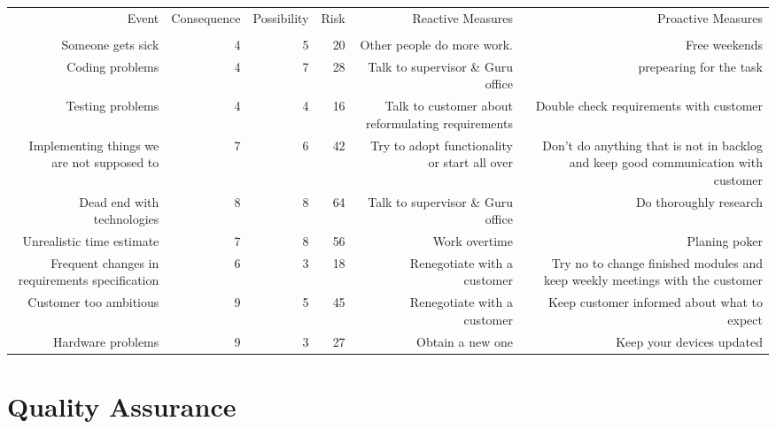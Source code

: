 \documentclass{article}
\begin{document}
\begin{tabular}{rrrrrr}
Event & Consequence & Possibility & Risk  & Reactive Measures & Proactive Measures \\
      &       &       &       &       &  \\
Someone gets sick & 4     & 5     & 20    & Other people do more work.  & Free weekends \\
Coding problems & 4     & 7     & 28    & Talk to supervisor \& Guru office & prepearing for the task \\
Testing problems & 4     & 4     & 16    & Talk to customer about reformulating requirements & Double check requirements with customer \\
Implementing things we are not supposed to & 7     & 6     & 42    & Try to adopt functionality or start all over & Don't do anything that is not in backlog and keep good communication with customer \\
Dead end with technologies & 8     & 8     & 64    & Talk to supervisor \& Guru office & Do thoroughly research \\
Unrealistic time estimate & 7     & 8     & 56    & Work overtime  & Planing poker \\
Frequent changes in requirements specification & 6     & 3     & 18    & Renegotiate with a customer & Try no to change finished modules and keep weekly meetings with the customer \\
Customer too ambitious & 9     & 5     & 45    & Renegotiate with a customer & Keep customer informed about what  to expect \\
Hardware problems & 9     & 3     & 27    & Obtain a new one & Keep your devices updated \\
\end{tabular}%


\section{Quality Assurance}
\end{document}
